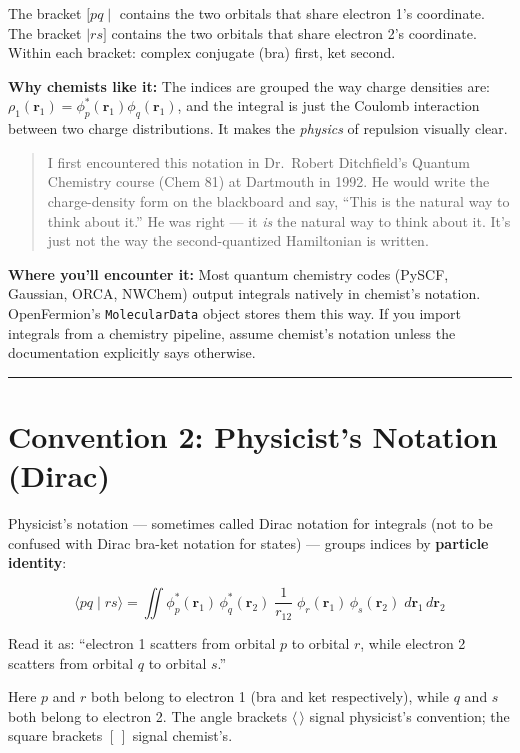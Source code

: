 \documentclass[
  11pt,
  oneside]{book}
\begin{document}
The bracket \([pq\mid\) contains the two orbitals that share electron
1's coordinate. The bracket \(\mid rs]\) contains the two orbitals that
share electron 2's coordinate. Within each bracket: complex conjugate
(bra) first, ket second.

\textbf{Why chemists like it:} The indices are grouped the way charge
densities are:
\(\rho_1(\mathbf{r}_1) = \phi_p^*(\mathbf{r}_1)\phi_q(\mathbf{r}_1)\),
and the integral is just the Coulomb interaction between two charge
distributions. It makes the \emph{physics} of repulsion visually clear.

\begin{quote}
I first encountered this notation in Dr.~Robert Ditchfield's Quantum
Chemistry course (Chem 81) at Dartmouth in 1992. He would write the
charge-density form on the blackboard and say, ``This is the natural way
to think about it.'' He was right --- it \emph{is} the natural way to
think about it. It's just not the way the second-quantized Hamiltonian
is written.
\end{quote}

\textbf{Where you'll encounter it:} Most quantum chemistry codes (PySCF,
Gaussian, ORCA, NWChem) output integrals natively in chemist's notation.
OpenFermion's \texttt{MolecularData} object stores them this way. If you
import integrals from a chemistry pipeline, assume chemist's notation
unless the documentation explicitly says otherwise.

\begin{center}\rule{0.5\linewidth}{0.5pt}\end{center}

\section{Convention 2: Physicist's Notation
(Dirac)}\label{convention-2-physicists-notation-dirac}

Physicist's notation --- sometimes called Dirac notation for integrals
(not to be confused with Dirac bra-ket notation for states) --- groups
indices by \textbf{particle identity}:

\[\langle pq \mid rs\rangle = \iint \phi_p^*(\mathbf{r}_1)\,\phi_q^*(\mathbf{r}_2)\;\frac{1}{r_{12}}\;\phi_r(\mathbf{r}_1)\,\phi_s(\mathbf{r}_2)\;d\mathbf{r}_1\,d\mathbf{r}_2\]

Read it as: ``electron 1 scatters from orbital \(p\) to orbital \(r\),
while electron 2 scatters from orbital \(q\) to orbital \(s\).''

Here \(p\) and \(r\) both belong to electron 1 (bra and ket
respectively), while \(q\) and \(s\) both belong to electron 2. The
angle brackets \(\langle\,\rangle\) signal physicist's convention; the
square brackets \([\,]\) signal chemist's.
\end{document}
